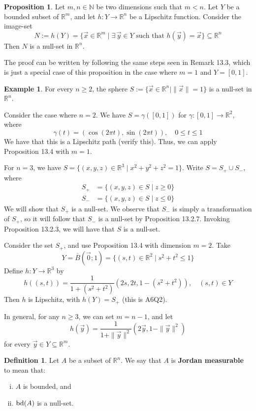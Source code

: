 \documentclass[11pt]{article}
\makeatletter
\theoremstyle{definition}
\newtheorem{defn}[thm]{Definition}
\newtheorem{exmp}[thm]{Example}
\newtheorem{prop}[thm]{Proposition}
\newcommand{\N}{\ensuremath{\mathbb{N}}}
\newcommand{\R}{\ensuremath{\mathbb{R}}}
\newenvironment{pf}[1][\proofname]{\par
  \pushQED{\qed}%
  \normalfont \topsep0\p@\relax
  \trivlist
  \item[\hskip\labelsep\itshape
  #1\@addpunct{.}]\ignorespaces
}{%
  \popQED\endtrivlist\@endpefalse
}
\makeatother
\begin{document}
\begin{prop}
Let $m, n \in \N$ be two dimensions such that $m < n$. Let $Y$ be a bounded subset of $\R^m$, and let $h : Y \to \R^n$ be a Lipschitz function. Consider the image-set
$$N := h(Y) = \{\vec{x} \in \R^m \mid \exists\,\vec{y} \in Y \text{ such that } h(\vec{y}) = \vec{x}\} \subseteq \R^n$$
Then $N$ is a null-set in $\R^n$.
\begin{pf}
The proof can be written by following the same steps seen in Remark 13.3, which is just a special case of this proposition in the case where $m = 1$ and $Y = [0, 1]$.
\end{pf}
\end{prop}

\begin{exmp}
For every $n \geq 2$, the sphere $S := \{\vec{x} \in \R^n \mid \|\vec{x}\| = 1\}$ is a null-set in $\R^n$.

Consider the case where $n = 2$. We have $S = \gamma([0, 1])$ for $\gamma : [0, 1] \to \R^2$, where
$$\gamma(t) = (\cos(2\pi t), \sin(2\pi t)), \quad 0 \leq t \leq 1$$
We have that this is a Lipschitz path (verify this). Thus, we can apply Proposition 13.4 with $m = 1$.

For $n = 3$, we have $S = \{(x, y, z) \in \R^3 \mid x^2 + y^2 + z^2 = 1\}$. Write $S = S_+ \cup S_-$, where
\begin{align*}
    S_+ &= \{(x, y, z) \in S \mid z \geq 0\} \\
    S_- &= \{(x, y, z) \in S \mid z \leq 0\}
\end{align*}
We will show that $S_+$ is a null-set. We observe that $S_-$ is simply a transformation of $S_+$, so it will follow that $S_-$ is a null-set by Proposition 13.2.7. Invoking Proposition 13.2.3, we will have that $S$ is a null-set.

Consider the set $S_+$, and use Proposition 13.4 with dimension $m = 2$. Take
$$Y = \bar{B}(\vec{0}; 1) = \{(s, t) \in \R^2 \mid s^2 + t^2 \leq 1\}$$
Define $h : Y \to \R^3$ by
$$h((s, t)) = \frac{1}{1 + (s^2 + t^2)} (2s, 2t, 1 - (s^2 + t^2)), \quad (s, t) \in Y$$
Then $h$ is Lipschitz, with $h(Y) = S_+$ (this is A6Q2).

In general, for any $n \geq 3$, we can set $m = n-1$, and let
$$h(\vec{y}) = \frac{1}{1 + \|\vec{y}\|^2} (2\vec{y}, 1 - \|\vec{y}\|^2)$$
for every $\vec{y} \in Y \subseteq \R^m$.
\end{exmp}

\begin{defn}
Let $A$ be a subset of $\R^n$. We say that $A$ is {\bf Jordan measurable} to mean that:\vspace{-1.5ex}
\begin{enumerate}[(i)]
\item $A$ is bounded, and
\item ${\rm bd}(A)$ is a null-set.
\end{enumerate}
\end{defn}
\end{document}
